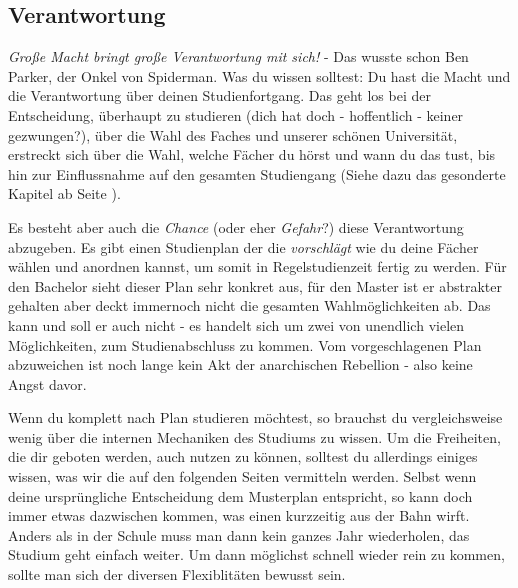 \subsection{Verantwortung}
\textit{Große Macht bringt große Verantwortung mit sich!} - Das wusste schon Ben Parker, der Onkel von Spiderman. Was du wissen solltest: Du hast die Macht und die Verantwortung über deinen Studienfortgang. Das geht los bei der Entscheidung, überhaupt zu studieren (dich hat doch - hoffentlich - keiner gezwungen?), über die Wahl des Faches und unserer schönen Universität, erstreckt sich über die Wahl, welche Fächer du hörst und wann du das tust, bis hin zur Einflussnahme auf den gesamten Studiengang (Siehe dazu das gesonderte Kapitel ab Seite \pageref{politik}).

Es besteht aber auch die \textit{Chance} (oder eher \textit{Gefahr}?) diese Verantwortung abzugeben. Es gibt einen Studienplan der die \textit{vorschlägt} wie du deine Fächer wählen und anordnen kannst, um somit in Regelstudienzeit fertig zu werden. Für den Bachelor sieht dieser Plan sehr konkret aus, für den Master ist er abstrakter gehalten aber deckt immernoch nicht die gesamten Wahlmöglichkeiten ab. Das kann und soll er auch nicht - es handelt sich um zwei von unendlich vielen Möglichkeiten, zum Studienabschluss zu kommen. Vom vorgeschlagenen Plan abzuweichen ist noch lange kein Akt der anarchischen Rebellion - also keine Angst davor.

Wenn du komplett nach Plan studieren möchtest, so brauchst du vergleichsweise wenig über die internen Mechaniken des Studiums zu wissen. Um die Freiheiten, die dir geboten werden, auch nutzen zu können, solltest du allerdings einiges wissen, was wir die auf den folgenden Seiten vermitteln werden. Selbst wenn deine ursprüngliche Entscheidung dem Musterplan entspricht, so kann doch immer etwas dazwischen kommen, was einen kurzzeitig aus der Bahn wirft. Anders als in der Schule muss man dann kein ganzes Jahr wiederholen, das Studium geht einfach weiter. Um dann möglichst schnell wieder rein zu kommen, sollte man sich der diversen Flexiblitäten bewusst sein.
